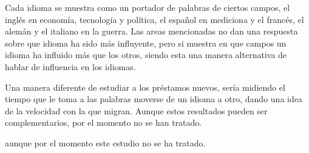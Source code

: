 Cada idioma se muestra como un portador de palabras de ciertos campos,  el inglés en economía, tecnología y política, el español en mediciona y el francés, el alemán y el italiano en la guerra.  Las areas mencionadas no dan una respuesta sobre que idioma ha sido más influyente, pero si muestra en que campos un idioma ha influido más que los otros, siendo esta una manera alternativa de hablar de influencia en los idiomas.
 
Una manera diferente de estudiar a los préstamos nuevos, sería midiendo el tiempo que le toma a las palabras moverse de un idioma a otro, dando una idea de la velocidad con la que migran. Aunque estos resultados pueden ser complementarios, por el momento no se han tratado. 


aunque por el momento este estudio no se ha tratado. 


















